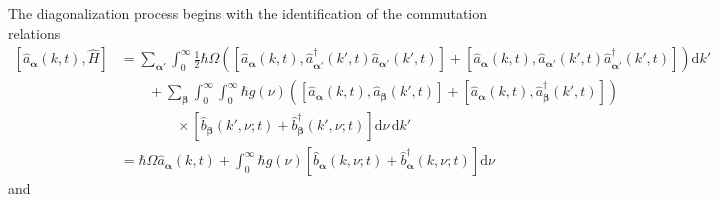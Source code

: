 The diagonalization process begins with the identification of the commutation relations
\begin{equation}
\begin{split}
\left[\hat{a}_{\bm{\alpha}}(k,t),\hat{H}\right] &= \sum_{\bm{\alpha}'}\int_0^\infty\frac{1}{2}\hbar\Omega\left(\left[\hat{a}_{\bm{\alpha}}(k,t),\hat{a}_{\bm{\alpha}'}^\dagger(k',t)\hat{a}_{\bm{\alpha}'}(k',t)\right] + \left[\hat{a}_{\bm{\alpha}}(k,t),\hat{a}_{\bm{\alpha}'}(k',t)\hat{a}_{\bm{\alpha}'}^\dagger(k',t)\right]\right)\mathrm{d}k'\\
&\qquad + \sum_{\bm{\beta}}\int_0^\infty\int_0^\infty \hbar g(\nu)\left(\left[\hat{a}_{\bm{\alpha}}(k,t),\hat{a}_{\bm{\beta}}(k',t)\right] + \left[\hat{a}_{\bm{\alpha}}(k,t),\hat{a}_{\bm{\beta}}^\dagger(k',t)\right]\right)\\
&\qquad\qquad\times\left[\hat{b}_{\bm{\beta}}(k',\nu;t) + \hat{b}_{\bm{\beta}}^\dagger(k',\nu;t)\right]\mathrm{d}\nu\,\mathrm{d}k'\\[0.5em]
&= \hbar\Omega\hat{a}_{\bm{\alpha}}(k,t) + \int_0^\infty \hbar g(\nu)\left[\hat{b}_{\bm{\alpha}}(k,\nu;t) + \hat{b}_{\bm{\alpha}}^\dagger(k,\nu;t)\right]\mathrm{d}\nu
\end{split}
\end{equation}
and
